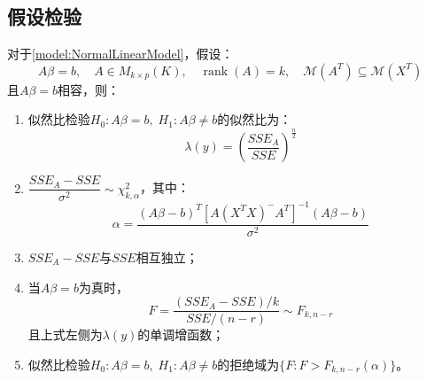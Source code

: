 \subsection{假设检验}
\begin{theorem}
	对于\cref{model:NormalLinearModel}，假设：
	\begin{equation*}
		A\beta=b,\quad A\in M_{k\times p}(K),\quad\operatorname{rank}(A)=k,\quad\mathcal{M}(A^T)\subseteq\mathcal{M}(X^T)
	\end{equation*}
	且$A\beta=b$相容，则：
	\begin{enumerate}
		\item 似然比检验$H_0:A\beta=b,\;H_1:A\beta\ne b$的似然比为：
		\begin{equation*}
			\lambda(y)=\left(\frac{SSE_A}{SSE}\right)^\frac{n}{2}
		\end{equation*}
		\item $\dfrac{SSE_A-SSE}{\sigma^2}\sim\chi^2_{k,\alpha}$，其中：
		\begin{equation*}
			\alpha=\frac{(A\beta-b)^T[A(X^TX)^-A^T]^{-1}(A\beta-b)}{\sigma^2}
		\end{equation*}
		\item $SSE_A-SSE$与$SSE$相互独立；
		\item 当$A\beta=b$为真时，
		\begin{equation*}
			F=\frac{(SSE_A-SSE)/k}{SSE/(n-r)}\sim F_{k,n-r}
		\end{equation*}
		且上式左侧为$\lambda(y)$的单调增函数；
		\item 似然比检验$H_0:A\beta=b,\;H_1:A\beta\ne b$的拒绝域为$\{F:F>F_{k,n-r}(\alpha)\}$。
	\end{enumerate}
\end{theorem}

